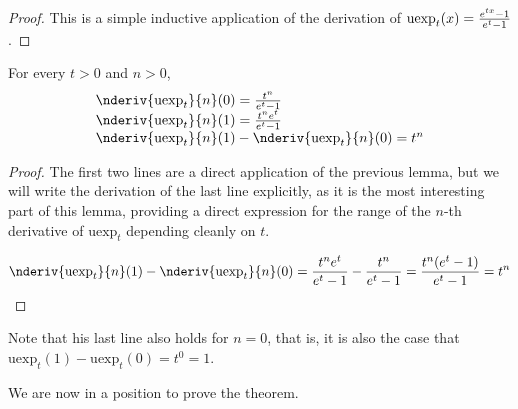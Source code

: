\documentclass[12pt,a4paper]{article}
\newcommand{\uexp}[1] {{\text{uexp}_{#1}}}
\begin{document}
\begin{proof}
This is a simple inductive application of the derivation of $\uexp{t}(x) = {{e^{tx} - 1} \over {e^t - 1}}$.
\end{proof}

\begin{lemma}
For every $t > 0$ and $n > 0$,
\begin{equation}
\begin{array}{l}
\nderiv{\uexp{t}}{n}(0) = {{t^n} \over {e^t - 1}}\\
\nderiv{\uexp{t}}{n}(1) = {{t^n e^t} \over {e^t - 1}}\\
\nderiv{\uexp{t}}{n}(1) - \nderiv{\uexp{t}}{n}(0) = t^n\\
\end{array}
\end{equation}
\end{lemma}

\begin{proof}
The first two lines are a direct application of the previous lemma, but we will write the derivation of the last line explicitly, as it is the most interesting part of this lemma, providing a direct expression for the range of the $n$-th derivative of $\uexp{t}$ depending cleanly on $t$.

\begin{equation}
\nderiv{\uexp{t}}{n}(1) - \nderiv{\uexp{t}}{n}(0) =  {{t^n e^t} \over {e^t - 1}} - {{t^n} \over {e^t - 1}} = {{t^n (e^t - 1)} \over {e^t -1}} = t^n
\end{equation}
\end{proof}

Note that his last line also holds for $n = 0$, that is, it is also the case that $\uexp{t}(1) - \uexp{t}(0) = t^0 = 1$.

We are now in a position to prove the theorem.
\end{document}

